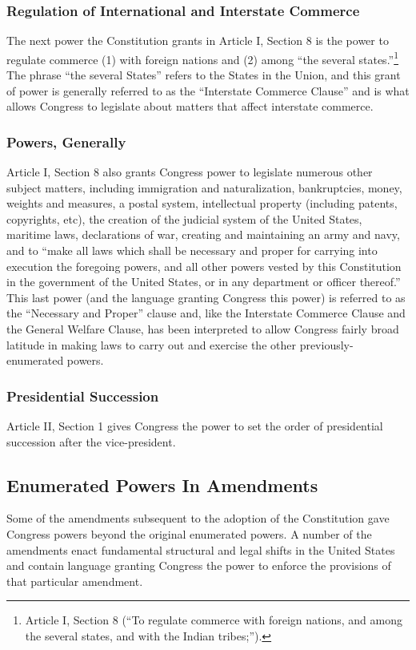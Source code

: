 \subsubsection{Regulation of International and Interstate Commerce}
The next power the Constitution grants in Article I, Section 8 is the power to regulate commerce (1) with foreign nations and (2) among ``the several states.''\footnote{Article I, Section 8 (``To regulate commerce with foreign nations, and among the several states, and with the Indian tribes;'').}
The phrase ``the several States'' refers to the States in the Union, and this grant of power is generally referred to as the ``Interstate Commerce Clause'' and is what allows Congress to legislate about matters that affect interstate commerce.

\subsubsection{Powers, Generally}
Article I, Section 8 also grants Congress power to legislate numerous other subject matters, including immigration and naturalization, bankruptcies, money, weights and measures, a postal system, intellectual property (including patents, copyrights, etc), the creation of the judicial system of the United States, maritime laws, declarations of war, creating and maintaining an army and navy, and to ``make all laws which shall be necessary and proper for carrying into execution the foregoing powers, and all other powers vested by this Constitution in the government of the United States, or in any department or officer thereof.''
This last power (and the language granting Congress this power) is referred to as the ``Necessary and Proper'' clause and, like the Interstate Commerce Clause and the General Welfare Clause, has been interpreted to allow Congress fairly broad latitude in making laws to carry out and exercise the other previously-enumerated powers.

\subsubsection{Presidential Succession}
Article II, Section 1 gives Congress the power to set the order of presidential succession after the vice-president.

\subsection{Enumerated Powers In Amendments}
Some of the amendments subsequent to the adoption of the Constitution gave Congress powers beyond the original enumerated powers.
A number of the amendments enact fundamental structural and legal shifts in the United States and contain language granting Congress the power to enforce the provisions of that particular amendment.

